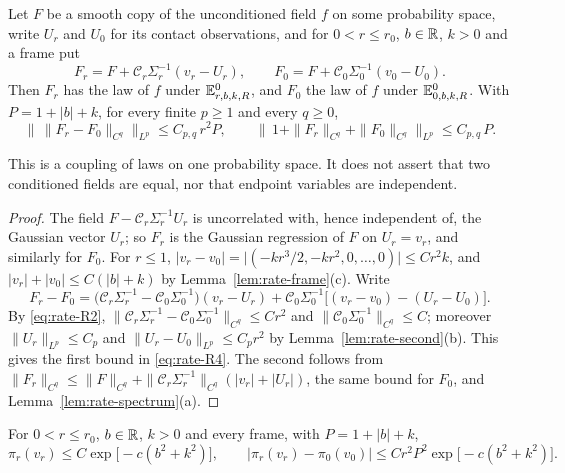 \begin{lemma}\label{lem:rate-coupling}
Let $F$ be a smooth copy of the unconditioned field $f$ on some probability space, write $U_r$ and $U_0$ for its contact observations, and for $0<r\le r_0$, $b\in\mathbb R$, $k>0$ and a frame put
\begin{equation}\label{eq:rate-R3}
F_r=F+\mathcal C_r\Sigma_r^{-1}(v_r-U_r),\qquad F_0=F+\mathcal C_0\Sigma_0^{-1}(v_0-U_0).
\end{equation}
Then $F_r$ has the law of $f$ under $\mathbb E^0_{r,b,k,R}$, and $F_0$ the law of $f$ under $\mathbb E^0_{0,b,k,R}$. With $P=1+|b|+k$, for every finite $p\ge1$ and every $q\ge0$,
\begin{equation}\label{eq:rate-R4}
\bigl\|\,\|F_r-F_0\|_{C^q}\bigr\|_{L^p}\le C_{p,q}\,r^2P,\qquad \bigl\|\,1+\|F_r\|_{C^q}+\|F_0\|_{C^q}\bigr\|_{L^p}\le C_{p,q}\,P .
\end{equation}
\end{lemma}

This is a coupling of laws on one probability space. It does not assert that two conditioned fields are equal, nor that endpoint variables are independent.

\begin{proof}
The field $F-\mathcal C_r\Sigma_r^{-1}U_r$ is uncorrelated with, hence independent of, the Gaussian vector $U_r$; so $F_r$ is the Gaussian regression of $F$ on $U_r=v_r$, and similarly for $F_0$. For $r\le1$, $|v_r-v_0|=\bigl|(-kr^3/2,-kr^2,0,\dots,0)\bigr|\le Cr^2k$, and $|v_r|+|v_0|\le C(|b|+k)$ by Lemma~\ref{lem:rate-frame}(c). Write
\[
F_r-F_0=\bigl(\mathcal C_r\Sigma_r^{-1}-\mathcal C_0\Sigma_0^{-1}\bigr)(v_r-U_r)+\mathcal C_0\Sigma_0^{-1}\bigl[(v_r-v_0)-(U_r-U_0)\bigr].
\]
By \eqref{eq:rate-R2}, $\|\mathcal C_r\Sigma_r^{-1}-\mathcal C_0\Sigma_0^{-1}\|_{C^q}\le Cr^2$ and $\|\mathcal C_0\Sigma_0^{-1}\|_{C^q}\le C$; moreover $\|U_r\|_{L^p}\le C_p$ and $\|U_r-U_0\|_{L^p}\le C_pr^2$ by Lemma~\ref{lem:rate-second}(b). This gives the first bound in \eqref{eq:rate-R4}. The second follows from $\|F_r\|_{C^q}\le\|F\|_{C^q}+\|\mathcal C_r\Sigma_r^{-1}\|_{C^q}(|v_r|+|U_r|)$, the same bound for $F_0$, and Lemma~\ref{lem:rate-spectrum}(a).
\end{proof}

\begin{lemma}\label{lem:rate-density}
For $0<r\le r_0$, $b\in\mathbb R$, $k>0$ and every frame, with $P=1+|b|+k$,
\begin{equation}\label{eq:rate-R5}
\pi_r(v_r)\le C\exp\bigl[-c(b^2+k^2)\bigr],\qquad |\pi_r(v_r)-\pi_0(v_0)|\le Cr^2P^2\exp\bigl[-c(b^2+k^2)\bigr].
\end{equation}
\end{lemma}

